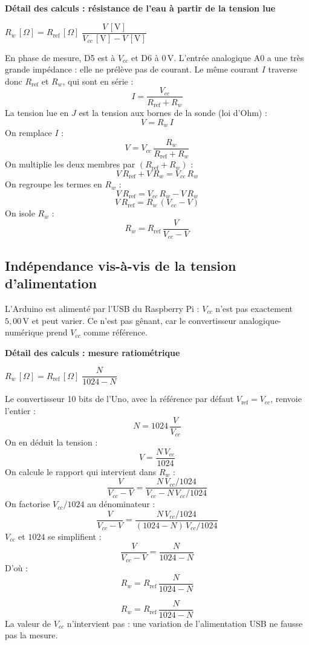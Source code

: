 \documentclass[11pt,a4paper]{article}
\newcommand{\resultat}[1]{\begin{center}{\large\color{bleuENO}$\displaystyle #1$}\end{center}}
\newenvironment{demo}[2]{\par\medskip\noindent\textbf{Détail des calculs : #1}\par\nopagebreak\resultat{#2}}{\par\medskip}
\newcommand{\U}[1]{\,\mathrm{#1}}
\begin{document}
\begin{demo}{résistance de l'eau à partir de la tension lue}{R_w\,[\Omega] = R_{\text{ref}}\,[\Omega] \; \dfrac{V\,[\mathrm{V}]}{V_{cc}\,[\mathrm{V}] - V\,[\mathrm{V}]}}
En phase de mesure, D5 est à $V_{cc}$ et D6 à $0\U{V}$. L'entrée analogique A0 a une très grande impédance : elle ne prélève pas de courant. Le même courant $I$ traverse donc $R_{\text{ref}}$ et $R_w$, qui sont en série :
\[
I = \frac{V_{cc}}{R_{\text{ref}} + R_w}
\]
La tension lue en $J$ est la tension aux bornes de la sonde (loi d'Ohm) :
\[
V = R_w \, I
\]
On remplace $I$ :
\[
V = V_{cc} \, \frac{R_w}{R_{\text{ref}} + R_w}
\]
On multiplie les deux membres par $(R_{\text{ref}} + R_w)$ :
\[
V \, R_{\text{ref}} + V \, R_w = V_{cc} \, R_w
\]
On regroupe les termes en $R_w$ :
\[
V \, R_{\text{ref}} = V_{cc} \, R_w - V \, R_w
\]
\[
V \, R_{\text{ref}} = R_w \, (V_{cc} - V)
\]
On isole $R_w$ :
\[
R_w = R_{\text{ref}} \, \frac{V}{V_{cc} - V}
\]
\end{demo}

\subsection{Indépendance vis-à-vis de la tension d'alimentation}

L'Arduino est alimenté par l'USB du Raspberry Pi : $V_{cc}$ n'est pas exactement $5{,}00\U{V}$ et peut varier. Ce n'est pas gênant, car le convertisseur analogique-numérique prend $V_{cc}$ comme référence.

\begin{demo}{mesure ratiométrique}{R_w\,[\Omega] = R_{\text{ref}}\,[\Omega] \; \dfrac{N}{1024 - N}}
Le convertisseur 10 bits de l'Uno, avec la référence par défaut $V_{\text{ref}} = V_{cc}$, renvoie l'entier :
\[
N = 1024 \, \frac{V}{V_{cc}}
\]
On en déduit la tension :
\[
V = \frac{N \, V_{cc}}{1024}
\]
On calcule le rapport qui intervient dans $R_w$ :
\[
\frac{V}{V_{cc} - V} = \frac{N \, V_{cc} / 1024}{V_{cc} - N \, V_{cc} / 1024}
\]
On factorise $V_{cc} / 1024$ au dénominateur :
\[
\frac{V}{V_{cc} - V} = \frac{N \, V_{cc} / 1024}{(1024 - N) \, V_{cc} / 1024}
\]
$V_{cc}$ et $1024$ se simplifient :
\[
\frac{V}{V_{cc} - V} = \frac{N}{1024 - N}
\]
D'où :
\[
R_w = R_{\text{ref}} \, \frac{N}{1024 - N}
\]
\end{demo}

\begin{retenir}
\[
R_w = R_{\text{ref}} \, \frac{N}{1024 - N}
\]
La valeur de $V_{cc}$ n'intervient pas : une variation de l'alimentation USB ne fausse pas la mesure.
\end{retenir}
\end{document}
